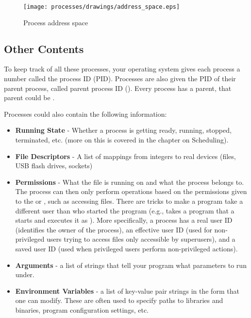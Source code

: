 \begin{figure}[H]
\centering
\texttt{[image: processes/drawings/address\_space.eps]}
\caption{Process address space}
\end{figure}



\subsection{Other Contents}

To keep track of all these processes, your operating system gives each process a number called the process ID (PID).
Processes are also given the PID of their parent process, called parent process ID ().
Every process has a parent, that parent could be .

Processes could also contain the following information:

\begin{itemize}
    \item \textbf{Running State} - Whether a process is getting ready, running, stopped, terminated, etc. (more on this is covered in the chapter on Scheduling).
    \item \textbf{File Descriptors} - A list of mappings from integers to real devices (files, USB flash drives, sockets)
    \item \textbf{Permissions} - What  the file is running on and what  the process belongs to.
          The process can then only perform operations based on the permissions given to the  or , such as accessing files.
		There are tricks to make a program take a different user than who started the program (e.g.,  takes a program that a  starts and executes it as ).
          More specifically, a process has a real user ID (identifies the owner of the process), an effective user ID (used for non-privileged users trying to access files only accessible by superusers), and a saved user ID (used when privileged users perform non-privileged actions).
    \item \textbf{Arguments} - a list of strings that tell your program what parameters to run under.
    \item \textbf{Environment Variables} - a list of key-value pair strings in the form  that one can modify. These are often used to specify paths to libraries and binaries, program configuration settings, etc.
\end{itemize}

